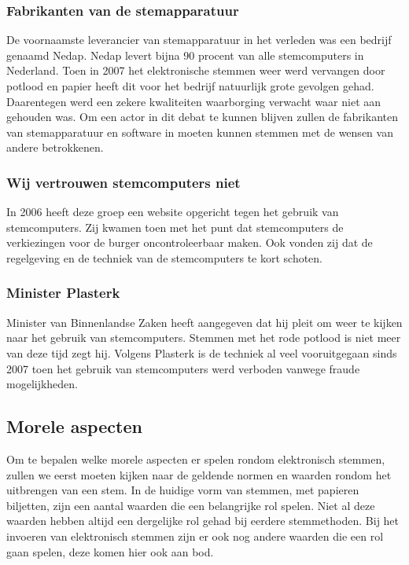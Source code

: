 \documentclass[a4paper]{article}
\begin{document}
\subsubsection{Fabrikanten van de stemapparatuur}
De voornaamste leverancier van stemapparatuur in het verleden was een bedrijf genaamd Nedap.
Nedap levert bijna 90 procent van alle stemcomputers in Nederland.
Toen in 2007 het elektronische stemmen weer werd vervangen door potlood en papier heeft dit voor het bedrijf natuurlijk grote gevolgen gehad.
Daarentegen werd een zekere kwaliteiten waarborging verwacht waar niet aan gehouden was.
Om een actor in dit debat te kunnen blijven zullen de fabrikanten van stemapparatuur en software in moeten kunnen stemmen met de wensen van andere betrokkenen.

\subsubsection{Wij vertrouwen stemcomputers niet}
In 2006 heeft deze groep een website opgericht tegen het gebruik van stemcomputers. 
Zij kwamen toen met het punt dat stemcomputers de verkiezingen voor de burger oncontroleerbaar maken.
Ook vonden zij dat de regelgeving en de techniek van de stemcomputers te kort schoten.

\subsubsection{Minister Plasterk}
Minister van Binnenlandse Zaken heeft aangegeven dat hij pleit om weer te kijken naar het gebruik van stemcomputers.
Stemmen met het rode potlood is niet meer van deze tijd zegt hij. 
Volgens Plasterk is de techniek al veel vooruitgegaan sinds 2007 toen het gebruik van stemcomputers werd verboden vanwege fraude mogelijkheden.


\subsection{Morele aspecten}
Om te bepalen welke morele aspecten er spelen rondom elektronisch stemmen, zullen we eerst moeten kijken naar de geldende normen en waarden rondom het uitbrengen van een stem.
In de huidige vorm van stemmen, met papieren biljetten, zijn een aantal waarden die een belangrijke rol spelen.
Niet al deze waarden hebben altijd een dergelijke rol gehad bij eerdere stemmethoden.
Bij het invoeren van elektronisch stemmen zijn er ook nog andere waarden die een rol gaan spelen, deze komen hier ook aan bod.
\end{document}
